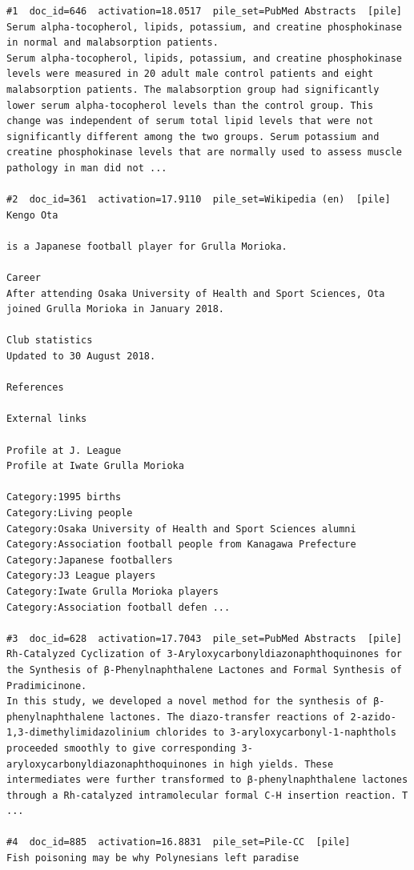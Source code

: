\begin{verbatim}
#1  doc_id=646  activation=18.0517  pile_set=PubMed Abstracts  [pile]
Serum alpha-tocopherol, lipids, potassium, and creatine phosphokinase in normal and malabsorption patients.
Serum alpha-tocopherol, lipids, potassium, and creatine phosphokinase levels were measured in 20 adult male control patients and eight malabsorption patients. The malabsorption group had significantly lower serum alpha-tocopherol levels than the control group. This change was independent of serum total lipid levels that were not significantly different among the two groups. Serum potassium and creatine phosphokinase levels that are normally used to assess muscle pathology in man did not ...

#2  doc_id=361  activation=17.9110  pile_set=Wikipedia (en)  [pile]
Kengo Ota

is a Japanese football player for Grulla Morioka.

Career
After attending Osaka University of Health and Sport Sciences, Ota joined Grulla Morioka in January 2018.

Club statistics
Updated to 30 August 2018.

References

External links

Profile at J. League
Profile at Iwate Grulla Morioka

Category:1995 births
Category:Living people
Category:Osaka University of Health and Sport Sciences alumni
Category:Association football people from Kanagawa Prefecture
Category:Japanese footballers
Category:J3 League players
Category:Iwate Grulla Morioka players
Category:Association football defen ...

#3  doc_id=628  activation=17.7043  pile_set=PubMed Abstracts  [pile]
Rh-Catalyzed Cyclization of 3-Aryloxycarbonyldiazonaphthoquinones for the Synthesis of β-Phenylnaphthalene Lactones and Formal Synthesis of Pradimicinone.
In this study, we developed a novel method for the synthesis of β-phenylnaphthalene lactones. The diazo-transfer reactions of 2-azido-1,3-dimethylimidazolinium chlorides to 3-aryloxycarbonyl-1-naphthols proceeded smoothly to give corresponding 3-aryloxycarbonyldiazonaphthoquinones in high yields. These intermediates were further transformed to β-phenylnaphthalene lactones through a Rh-catalyzed intramolecular formal C-H insertion reaction. T ...

#4  doc_id=885  activation=16.8831  pile_set=Pile-CC  [pile]
Fish poisoning may be why Polynesians left paradise


\end{verbatim}
